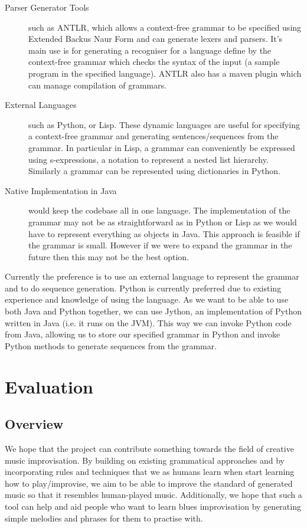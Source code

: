 \documentclass[pdftex,12pt,a4paper]{report}
\begin{document}
\begin{description}
  \item[Parser Generator Tools] such as ANTLR, which allows a context-free grammar to be specified using Extended Backus Naur Form and can generate lexers and parsers. It's main use is for generating a recogniser for a language define by the context-free grammar which checks the syntax of the input (a sample program in the specified language). ANTLR also has a maven plugin which can manage compilation of grammars.
  \item[External Languages] such as Python, or Lisp. These dynamic languages are useful for specifying a context-free grammar and generating sentences/sequences from the grammar. In particular in Lisp, a grammar can conveniently be expressed using s-expressions, a notation to represent a nested list hierarchy. Similarly a grammar can be represented using dictionaries in Python. 
  \item[Native Implementation in Java] would keep the codebase all in one language. The implementation of the grammar may not be as straightforward as in Python or Lisp as we would have to represent everything as objects in Java. This approach is feasible if the grammar is small. However if we were to expand the grammar in the future then this may not be the best option.
\end{description}

Currently the preference is to use an external language to represent the grammar and to do sequence generation. Python is currently preferred due to existing experience and knowledge of using the language. As we want to be able to use both Java and Python together, we can use Jython, an implementation of Python written in Java (i.e. it runs on the JVM). This way we can invoke Python code from Java, allowing us to store our specified grammar in Python and invoke Python methods to generate sequences from the grammar.

\chapter{Evaluation}

\section{Overview}
We hope that the project can contribute something towards the field of creative music improvisation. By building on existing grammatical approaches and by incorporating rules and techniques that we as humans learn when start learning how to play/improvise, we aim to be able to improve the standard of generated music so that it resembles human-played music. Additionally, we hope that such a tool can help and aid people who want to learn blues improvisation by generating simple melodies and phrases for them to practise with.  
\end{document}
